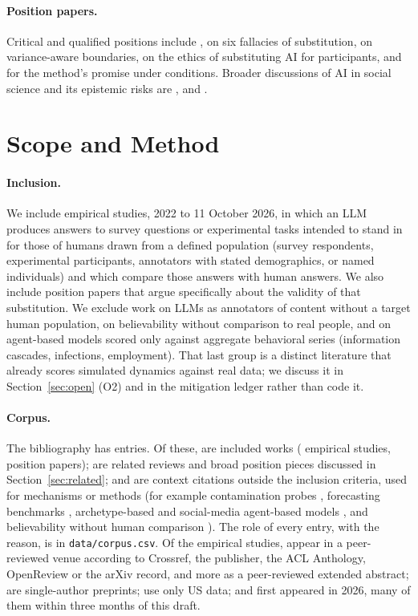 \documentclass[11pt]{article}
\begin{document}
\paragraph{Position papers.} Critical and qualified positions include \citet{dillion2023}, \citet{lin2025} on six fallacies of substitution, \citet{wu2025boundary} on variance-aware boundaries, \citet{agnew2024} on the ethics of substituting AI for participants, and \citet{anthis2025} for the method's promise under conditions. Broader discussions of AI in social science and its epistemic risks are \citet{grossmann2023}, \citet{bail2024} and \citet{messeri2024}.

\section{Scope and Method}
\label{sec:method}

\paragraph{Inclusion.} We include empirical studies, 2022 to 11 October 2026, in which an LLM produces answers to survey questions or experimental tasks intended to stand in for those of humans drawn from a defined population (survey respondents, experimental participants, annotators with stated demographics, or named individuals) and which compare those answers with human answers. We also include position papers that argue specifically about the validity of that substitution. We exclude work on LLMs as annotators of content without a target human population, on believability without comparison to real people, and on agent-based models scored only against aggregate behavioral series (information cascades, infections, employment). That last group is a distinct literature that already scores simulated dynamics against real data; we discuss it in Section~\ref{sec:open} (O2) and in the mitigation ledger rather than code it.

\paragraph{Corpus.} The bibliography has \cBib{} entries. Of these, \cIncluded{} are included works (\cEmp{} empirical studies, \cPos{} position papers); \cRel{} are related reviews and broad position pieces discussed in Section~\ref{sec:related}; and \cCtx{} are context citations outside the inclusion criteria, used for mechanisms or methods (for example contamination probes \citep{golchin2023}, forecasting benchmarks \citep{karger2024forecastbench}, archetype-based and social-media agent-based models \citep{chopra2024archetypes,yang2024oasis}, and believability without human comparison \citep{park2023generative}). The role of every entry, with the reason, is in \nolinkurl{data/corpus.csv}. Of the \cEmp{} empirical studies, \cEmpPeer{} appear in a peer-reviewed venue according to Crossref, the publisher, the ACL Anthology, OpenReview or the arXiv record, and \cEmpExt{} more as a peer-reviewed extended abstract; \cEmpSingle{} are single-author preprints; \cEmpUS{} use only US data; and \cEmpYearTwentySix{} first appeared in 2026, many of them within three months of this draft.
\end{document}
